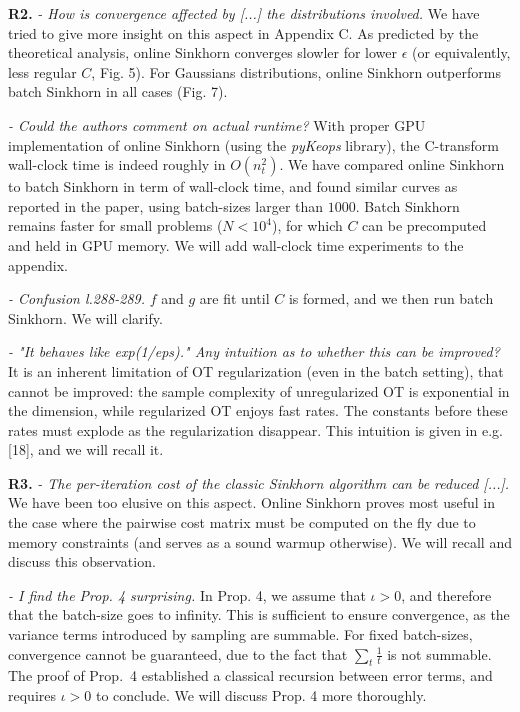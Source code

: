 \documentclass{article}
\begin{document}
\textbf{R2.} \textit{- How is convergence affected by [...] the distributions involved.} We have tried to give more insight on this aspect in Appendix C. As predicted by the theoretical analysis, online Sinkhorn converges slowler for lower $\epsilon$ (or equivalently, less regular $C$, Fig. 5). For Gaussians distributions, online Sinkhorn outperforms batch Sinkhorn in all cases (Fig. 7).

\textit{- Could the authors comment on actual runtime?} With proper GPU
implementation of online Sinkhorn (using the \textit{pyKeops} library), the C-transform wall-clock time is indeed roughly in $O(n_t^2) $. We have compared
online Sinkhorn to batch Sinkhorn in term of wall-clock time, and found similar
curves as reported in the paper, using batch-sizes larger than $1000$. Batch Sinkhorn
remains faster for small problems ($N < 10^4$), for which $C$ can be precomputed and
held in GPU memory. We will add wall-clock time experiments to the appendix.

\textit{- Confusion l.288-289.} $f$ and $g$ are fit until $C$ is formed, and we then run batch Sinkhorn. We will clarify.

\textit{- "It behaves like exp(1/eps)." Any intuition as to whether this can be improved?}
It is an inherent limitation of OT regularization (even in the batch setting), that cannot be improved: the sample complexity of unregularized OT is exponential in the dimension, while regularized OT enjoys fast rates. The constants before these rates must explode as the regularization disappear. This intuition is given in e.g. [18], and we will recall it.

\textbf{R3.} 
\textit{- The per-iteration cost of the classic Sinkhorn algorithm can
be reduced [...].} We have been too elusive on this aspect. Online Sinkhorn proves most useful in the case where the
pairwise cost matrix must be computed on the fly due to memory constraints (and serves as a sound warmup otherwise). We will recall and discuss this observation.

\textit{- I find the Prop. 4 surprising.} In Prop. 4, we assume that $\iota > 0$,
and therefore that the batch-size goes to infinity. This is sufficient to ensure
convergence, as the variance terms introduced by sampling are summable. For
fixed batch-sizes, convergence cannot be guaranteed, due to the fact that
$\sum_t \frac{1}{t}$ is not summable. The proof of Prop.~4 established a
classical recursion between error terms, and requires $\iota > 0$ to conclude.
We will discuss Prop. 4 more thoroughly.
\end{document}
